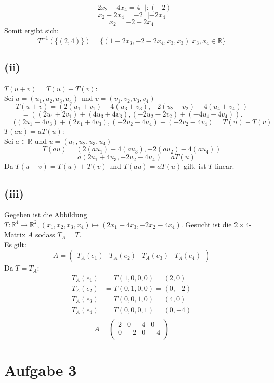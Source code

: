 \documentclass{article}
\begin{document}
\[-2x_2-4x_4=4\ \ \ |:(-2)\]
\[x_2+2x_4 = -2\ \ \ |-2x_4\]
\[x_2= -2-2x_4\]
Somit ergibt sich:
\[T^{-1}(\{(2,4)\})=\{(1-2x_3,-2-2x_4,x_3,x_3)|x_3,x_4\in \mathbb{R}\}\]

\subsection{(ii)}
\(T(u+v)=T(u)+T(v)\):\\
Sei $u=(u_1,u_2,u_3,u_4)$ und $v=(v_1,v_2,v_3,v_4)$
\[T(u+v)=(2(u_1+v_1)+4(u_3+v_3),-2(u_2+v_2)-4(u_4+v_4)) \]
\[=((2u_1 + 2v_1) + (4u_3 + 4v_3), (-2u_2 - 2v_2) + (-4u_4 - 4v_4)).\]
\[=( (2u_1 + 4u_3) + (2v_1 + 4v_3), (-2u_2 - 4u_4) + (-2v_2 - 4v_4)=T(u)+T(v)\]
\newline
\(T(au)=aT(u)\): \\
Sei \(a \in \mathbb{R}\) und \(u=(u_1,u_2,u_3,u_4)\)
\[T(au)=(2(au_1)+4(au_3),-2(au_2)-4(au_4))\]
\[=a(2u_1+4u_3,-2u_2-4u_4) = aT(u)\]
\newline
Da $T(u+v)=T(u)+T(v)$ und $T(au)=aT(u)$ gilt, ist $T$ linear.

\subsection{(iii)}
Gegeben ist die Abbildung $T: \mathbb{R}^4 \to \mathbb{R}^2, (x_1, x_2, x_3, x_4) \mapsto (2x_1 + 4x_3, -2x_2 - 4x_4)$.
Gesucht ist die $2 \times 4$-Matrix $A$ sodass $T_A = T$. \\
Es gilt: \[A = \left(\begin{matrix}
    T_A(e_1) & T_A(e_2) & T_A(e_3) & T_A(e_4)
\end{matrix}\right)\]
Da $T = T_A$:
\begin{align*}
    T_A(e_1) &= T(1, 0, 0 ,0) = (2, 0) \\
    T_A(e_2) &= T(0, 1, 0 ,0) = (0, -2) \\
    T_A(e_3) &= T(0, 0, 1 ,0) = (4, 0) \\
    T_A(e_4) &= T(0, 0, 0 ,1) = (0, -4) \\
\end{align*}
\[A = \left(\begin{matrix}
    2 & 0 & 4  & 0 \\
    0 & -2 & 0 & -4 \\
\end{matrix}\right)\]

\section{Aufgabe 3}
\end{document}
